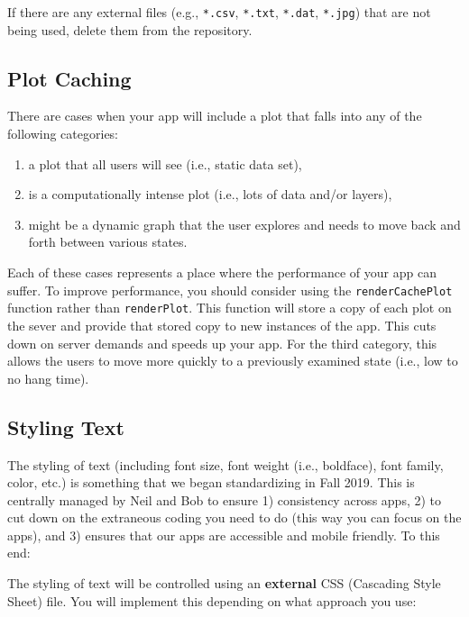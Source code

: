 \documentclass[
]{book}
\providecommand{\tightlist}{%
  \setlength{\itemsep}{0pt}\setlength{\parskip}{0pt}}
\begin{document}
If there are any external files (e.g., \texttt{*.csv}, \texttt{*.txt}, \texttt{*.dat}, \texttt{*.jpg}) that are not being used, delete them from the repository.

\hypertarget{plotCachec}{%
\subsection{Plot Caching}\label{plotCachec}}

There are cases when your app will include a plot that falls into any of the following categories:

\begin{enumerate}
\def\labelenumi{\arabic{enumi})}
\tightlist
\item
  a plot that all users will see (i.e., static data set),
\item
  is a computationally intense plot (i.e., lots of data and/or layers),
\item
  might be a dynamic graph that the user explores and needs to move back and forth between various states.
\end{enumerate}

Each of these cases represents a place where the performance of your app can suffer. To improve performance, you should consider using the \texttt{renderCachePlot} function rather than \texttt{renderPlot}. This function will store a copy of each plot on the sever and provide that stored copy to new instances of the app. This cuts down on server demands and speeds up your app. For the third category, this allows the users to move more quickly to a previously examined state (i.e., low to no hang time).

\hypertarget{textStylec}{%
\subsection{Styling Text}\label{textStylec}}

The styling of text (including font size, font weight (i.e., boldface), font family, color, etc.) is something that we began standardizing in Fall 2019. This is centrally managed by Neil and Bob to ensure 1) consistency across apps, 2) to cut down on the extraneous coding you need to do (this way you can focus on the apps), and 3) ensures that our apps are accessible and mobile friendly. To this end:

The styling of text will be controlled using an \textbf{external} CSS (Cascading Style Sheet) file. You will implement this depending on what approach you use:
\end{document}
